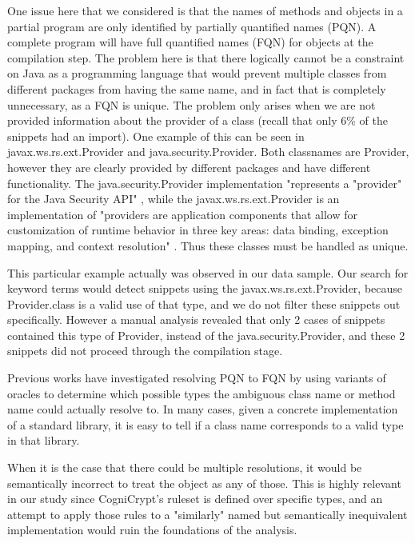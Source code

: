 \documentclass[10pt, conference]{IEEEtran}
\begin{document}
One issue here that we considered is that the names of methods and objects in a partial program are only identified by partially quantified names (PQN). A complete program will have full quantified names (FQN) for objects at the compilation step. The problem here is that there logically cannot be a constraint on Java as a programming language that would prevent multiple classes from different packages from having the same name, and in fact that is completely unnecessary, as a FQN is unique. The problem only arises when we are not provided information about the provider of a class (recall that only 6\% of the snippets had an import). One example of this can be seen in javax.ws.rs.ext.Provider and java.security.Provider. Both classnames are Provider, however they are clearly provided by different packages and have different functionality. The java.security.Provider implementation "represents a "provider" for the Java Security API" \cite{Security.Provider}, while the javax.ws.rs.ext.Provider is an implementation of "providers are application components that allow for customization of runtime behavior in three key areas: data binding, exception mapping, and context resolution" \cite{jax.Provider}. Thus these classes must be handled as unique. 

This particular example actually was observed in our data sample. Our search for keyword terms would detect snippets using the javax.ws.rs.ext.Provider, because Provider.class is a valid use of that type, and we do not filter these snippets out specifically. However a manual analysis revealed that only 2 cases of snippets contained this type of Provider, instead of the java.security.Provider, and these 2 snippets did not proceed through the compilation stage.

Previous works \cite{Subramanian:2014:LAD:2568225.2568313} have investigated resolving PQN to FQN by using variants of oracles to determine which possible types the ambiguous class name or method name could actually resolve to. In many cases, given a concrete implementation of a standard library, it is easy to tell if a class name corresponds to a valid type in that library. 

When it is the case that there could be multiple resolutions, it would be semantically incorrect to treat the object as any of those. This is highly relevant in our study since CogniCrypt's ruleset is defined over specific types, and an attempt to apply those rules to a "similarly" named but semantically inequivalent implementation would ruin the foundations of the analysis.
\end{document}
